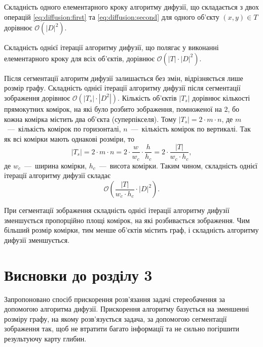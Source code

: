 Складність одного елементарного кроку алгоритму дифузії,
що складається з двох операцій \eqref{eq:diffusion:first} та
\eqref{eq:diffusion:second} для одного об'єкту $\left(x, y \right) \in T$
дорівнює $\mathcal{O} \left( \left| D \right|^2 \right)$.

Складність однієї ітерації алгоритму дифузії,
що полягає у виконанні елементарного кроку для всіх об'єктів,
дорівнює $\mathcal{O} \left(\left|T \right| \cdot \left|D\right|^2 \right)$.

Після сегментації алгоритм дифузії залишається без змін,
відрізняється лише розмір графу.
Складність однієї ітерації алгоритму дифузії
після сегментації зображення дорівнює
$\mathcal{O} \left( \left| T_s \right| \cdot \left| D^2 \right| \right)$.
Кількість об'єктів $\left| T_s \right|$ дорівнює кількості прямокутних комірок,
на які було розбито зображення, помноженої на $2$,
бо кожна комірка містить два об'єкта (суперпікселя).
Тому $\left| T_s \right| = 2 \cdot m \cdot n$,
де $m$~---~кількість комірок по горизонталі,
$n$~---~кількість комірок по вертикалі.
Так як всі комірки мають однакові розміри, то
\begin{equation*}
    \left| T_s \right| =
    2 \cdot m \cdot n =
    2 \cdot \frac{w}{w_c} \cdot \frac{h}{h_c} =
    2 \cdot \frac{\left| T \right|}{w_c \cdot h_c},
\end{equation*}
де $w_c$~---~ширина комірки, $h_c$~---~висота комірки.
Таким чином, складність однієї ітерації алгоритму дифузії складає
\begin{equation*}
    \mathcal{O} \left(
        \frac{\left| T \right|}{w_c \cdot h_c} \cdot \left| D \right|^2
    \right).
\end{equation*}

При сегментації зображення складність однієї ітерації алгоритму дифузії
зменшується пропорційно площі комірок, на які розбивається зображення.
Чим більший розмір комірки, тим менше об'єктів містить граф,
і складність алгоритму дифузії зменшується.

\section*{Висновки до розділу 3}

Запропоновано спосіб прискорення розв'язання задачі стереобачення
за допомогою алгоритма дифузії.
Прискорення алгоритму базується на зменшенні розміру графу,
на якому розв'язується задача, за допомогою сегментації зображення так,
щоб не втратити багато інформації та
не сильно погіршити результуючу карту глибин.
